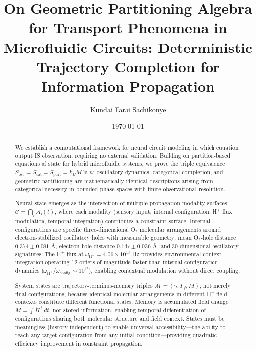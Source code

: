 \documentclass[aps,prd,twocolumn,superscriptaddress,floatfix,nofootinbib]{revtex4-2}
\theoremstyle{remark}
\begin{document}
\title{On Geometric Partitioning Algebra for Transport Phenomena in Microfluidic Circuits: Deterministic Trajectory Completion for Information Propagation }

\author{Kundai Farai Sachikonye}

\date{\today}

\begin{abstract}

We establish a computational framework for neural circuit modeling in which equation output IS observation, requiring no external validation. Building on partition-based equations of state for hybrid microfluidic systems, we prove the triple equivalence $S_{\text{osc}} = S_{\text{cat}} = S_{\text{part}} = k_B M \ln n$: oscillatory dynamics, categorical completion, and geometric partitioning are mathematically identical descriptions arising from categorical necessity in bounded phase spaces with finite observational resolution.

Neural state emerges as the intersection of multiple propagation modality surfaces $\mathcal{C} = \bigcap_i \mathcal{A}_i(t)$, where each modality (sensory input, internal configuration, H$^+$ flux modulation, temporal integration) contributes a constraint surface. Internal configurations are specific three-dimensional O$_2$ molecular arrangements around electron-stabilized oscillatory holes with measurable geometry: mean O$_2$-hole distance $0.374 \pm 0.081$ \AA, electron-hole distance $0.147 \pm 0.036$ \AA, and 30-dimensional oscillatory signatures. The H$^+$ flux at $\omega_{\text{H}^+} = 4.06 \times 10^{13}$ Hz provides environmental context integration operating 12 orders of magnitude faster than internal configuration dynamics ($\omega_{\text{H}^+}/\omega_{\text{config}} \sim 10^{12}$), enabling contextual modulation without direct coupling.

System states are trajectory-terminus-memory triples $\mathcal{M} = (\gamma, \Gamma_f, M)$, not merely final configurations, because identical molecular arrangements in different H$^+$ field contexts constitute different functional states. Memory is accumulated field change $M = \int \dot{H}^+ \, dt$, not stored information, enabling temporal differentiation of configurations sharing both molecular structure and field context. States must be meaningless (history-independent) to enable universal accessibility—the ability to reach any target configuration from any initial condition—providing quadratic efficiency improvement in constraint propagation.


\end{abstract}
\end{document}
